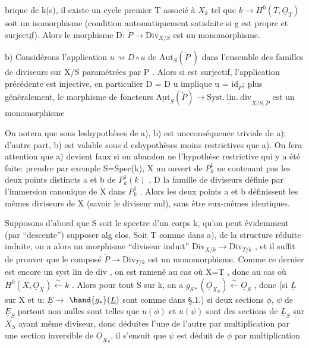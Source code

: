 brique de k(s), il existe un cycle premier T associé à $X_k$ tel que
$k \to H^0(T,\underline{O}_T)$ soit un isomorphisme (condition automatiquement satisfaite
si g est propre et surject\uline{i}f). Alors le morphisme D: $\check{P} \longrightarrow \mathrm{Div}_{X/S}$ est
un monomorphisme.

b)  Considérons l'application $u \rightsquigarrow D\circ u$ de
$\mathrm{Aut}_S(\check{P}\ )$ dans l'ensemble des familles de diviseurs sur X/S paramétrées
par P . Alors si  est surjectif, l'application précédente est injective,
en particulier D = D u implique u = $\mathrm{id}_{\check{P}}$; plus généralement, le morphisme de foncteurs $\underline{\mathrm{Aut}}_S(\check{P}) \longrightarrow \underline{\mathrm{Syst.\ lin.\ div}}_{X/S,\check{P}}$ est un monomorphisme

On notera que sous leshypothèses de a), b) est uneconséquence
triviale de a); d'autre part, b) est valable sous d eshypothèses moins
restrictives que a). On fera attention que a) devient faux si on abandon
ne l'hypothèse restrictive qui y a  été faite: prendre par exemple
S=Spec(k), X un ouvert de $P^1_k$ ne contenant pas les deux points distincts
a et b de $P^1_k(k)$ , D la famille de diviseurs définie par l'immersion
canonique de X dans $P^1_k$ . Alors les deux  points a et b
définissent les mêmes diviseurs de X (savoir le diviseur nul), sans être
eux-mêmes identiques.

Supposons d'abord que S soit le spectre d'un corps k, qu'on peut évidemment (par ``descente'') supposer alg clos. 
Soit T comme dans a),  de la structure réduite induite, on a alors un morphisme ``diviseur induit''
$\mathrm{Div}_{X/k} \longrightarrow \mathrm{Div}_{T/k}$ , et il suffit de prouver que le composé $\check{P} \longrightarrow \mathrm{Div}_{T/k}$
est un monomorphisme. Comme ce dernier est encore un syst lin de div ,
on est ramené au cas où X=T , donc au cas où $H^0(X,\underline{O}_X) \xleftarrow{\sim} k$ . Alors pour
tout S sur k, on a $g_{S*}(\underline{O}_{X_S}) \xleftarrow{\sim} \underline{O}_S$ , donc (si $\underline{L}$ sur X et u: $\underline{E} \to$ $\hand{g_*}(\underline{L})$
sont comme dans §.1.) si deux sections $\phi$, $\psi$ de $\underline{E}_S$ partout non nulles
sont telles que $u(\phi)$ et $u(\psi)$ sont des sections de $\underline{L}_S$ sur $X_S$ ayant même
diviseur, donc  déduites l'une de l'autre par multiplication par
une section inversible de $\underline{O}_{X_S}$, il s'ensuit que $\psi$ est déduit de $\phi$ par multiplication

